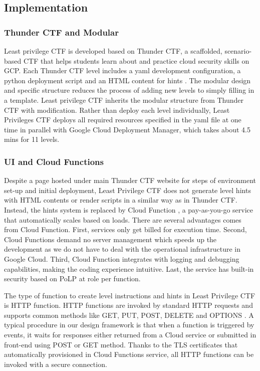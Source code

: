 \subsection{Implementation}

\subsubsection{Thunder CTF and Modular}
Least privilege CTF is developed based on Thunder CTF, a scaffolded, scenario-based CTF that helps students learn about and practice cloud security skills on GCP. Each Thunder CTF level includes a yaml development configuration, a python deployment script and an HTML content for hints \cite{Springer}. The modular design and specific structure reduces the process of adding new levels to simply filling in a template. Least privilege CTF inherits the modular structure from Thunder CTF with modification. Rather than deploy each level individually, Least Privileges CTF deploys all required resources specified in the yaml file at one time in parallel with Google Cloud Deployment Manager, which takes about 4.5 mins for 11 levels.

\subsubsection{UI and Cloud Functions}
Despite a page \cite{lst-ctf} hosted under main Thunder CTF website for steps of environment set-up and initial deployment, Least Privilege CTF does not generate level hints with HTML contents or render scripts in a similar way as in Thunder CTF. Instead, the hints system is replaced by Cloud Function \cite{cloudfunc}, a pay-as-you-go service that automatically scales based on loads. There are several advantages comes from Cloud Function. First, services only get billed for execution time. Second, Cloud Functions demand no server management which speeds up the development as we do not have to deal with the operational infrastructure in Google Cloud. Third, Cloud Function integrates with logging and debugging capabilities, making the coding experience intuitive. Last, the service has built-in security based on PoLP at role per function. 

The type of function to create level instructions and hints in Least Privilege CTF is HTTP function. HTTP functions are invoked by standard HTTP requests and supports common methods like GET, PUT, POST, DELETE and OPTIONS \cite{httpfunc}. A typical procedure in our design framework is that when a function is triggered by events, it waits for responses either returned from a Cloud service or submitted in front-end using POST or GET method. Thanks to the TLS certificates that automatically provisioned in Cloud Functions service, all HTTP functions can be invoked with a secure connection. 

